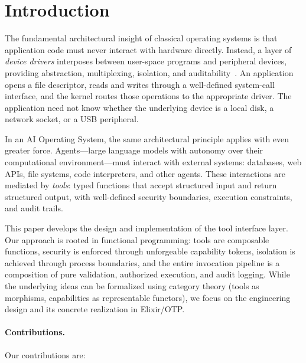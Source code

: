 \documentclass[12pt,a4paper]{article}
\theoremstyle{plain}
\theoremstyle{definition}
\begin{document}
\tableofcontents
\newpage

\section{Introduction}
\label{sec:intro}

The fundamental architectural insight of classical operating systems is that application code must never interact with hardware directly. Instead, a layer of \emph{device drivers} interposes between user-space programs and peripheral devices, providing abstraction, multiplexing, isolation, and auditability~\citep{tanenbaum2014modern}. An application opens a file descriptor, reads and writes through a well-defined system-call interface, and the kernel routes those operations to the appropriate driver. The application need not know whether the underlying device is a local disk, a network socket, or a USB peripheral.

In an AI Operating System, the same architectural principle applies with even greater force. Agents---large language models with autonomy over their computational environment---must interact with external systems: databases, web APIs, file systems, code interpreters, and other agents. These interactions are mediated by \emph{tools}: typed functions that accept structured input and return structured output, with well-defined security boundaries, execution constraints, and audit trails.

This paper develops the design and implementation of the tool interface layer. Our approach is rooted in functional programming: tools are composable functions, security is enforced through unforgeable capability tokens, isolation is achieved through process boundaries, and the entire invocation pipeline is a composition of pure validation, authorized execution, and audit logging. While the underlying ideas can be formalized using category theory (tools as morphisms, capabilities as representable functors), we focus on the engineering design and its concrete realization in Elixir/OTP.

\paragraph{Contributions.} Our contributions are:
\end{document}
